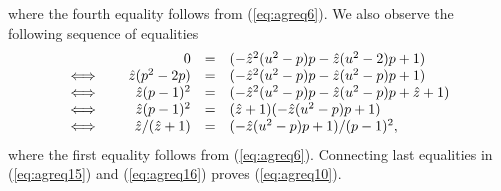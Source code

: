 \documentclass[10pt]{article}
\begin{document}
where the fourth equality follows from (\ref{eq:agreq6}). We also observe the following sequence of equalities
\begin{eqnarray}
\begin{array}{lrclcl}
  & 0  & = &    ( -\hat{z}^2(u^2-p)p -\hat{z}(u^2-2)p +1)  \\
\Longleftrightarrow \quad $ $ &  \hat{z}(p^2-2p)  & = &  (-\hat{z}^2(u^2-p)p -\hat{z}(u^2-p)p +1)  \\
\Longleftrightarrow \quad $ $ &  \hat{z}(p-1)^2   & = &   (-\hat{z}^2(u^2-p)p -\hat{z}(u^2-p)p +\hat{z}+1)  \\
\Longleftrightarrow \quad $ $ &  \hat{z}(p-1)^2   & = &   (\hat{z}+1)(-\hat{z}(u^2-p)p +1) \\
\Longleftrightarrow \quad $ $ &   \hat{z}/(\hat{z}+1)     & = &    (-\hat{z}(u^2-p)p +1)/(p-1)^2,
\end{array}\label{eq:agreq16}
\end{eqnarray}
where the first equality follows from (\ref{eq:agreq6}). Connecting last equalities in (\ref{eq:agreq15}) and (\ref{eq:agreq16}) proves (\ref{eq:agreq10}).



\vspace{.2in}
\end{document}
